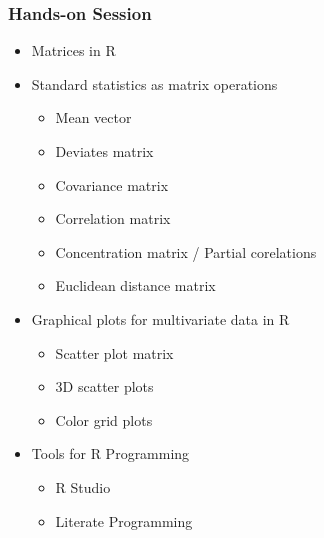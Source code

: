 \documentclass{beamer}
\begin{document}
\begin{frame}
  \frametitle{Hands-on Session}
		\begin{itemize}
    \item Matrices in R
		\item Standard statistics as matrix operations
        \begin{itemize}
        	\item Mean vector
        	\item Deviates matrix
        	\item Covariance matrix
        	\item Correlation matrix
        	\item Concentration matrix / Partial corelations
        	\item Euclidean distance matrix		  
        \end{itemize}
		  
	\item Graphical plots for multivariate data in R
        \begin{itemize}
        	\item Scatter plot matrix
            \item 3D scatter plots
            \item Color grid plots
        \end{itemize}

    \item Tools for R Programming
        \begin{itemize}
            \item R Studio
            \item Literate Programming
        \end{itemize}
    \end{itemize}

\end{frame}		
\end{document}
